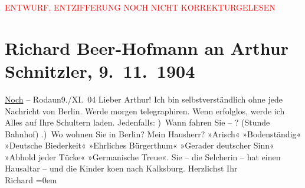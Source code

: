 
\begin{center}
            \textcolor{red}{ENTWURF. ENTZIFFERUNG NOCH NICHT KORREKTURGELESEN}
                      \end{center}
            
               \section[Richard Beer-Hofmann an Arthur Schnitzler, 9. 11. 1904]{ Richard Beer-Hofmann an Arthur Schnitzler,
               9. 11. 1904}\nopagebreak{}\rehead{ }\begin{ledgroupsized}[t]{13cm}\normalsize\beginnumbering{} \toendnotes[C]{\smallbreak\pagebreak[2]} 
\toendnotes[C]{\smallbreak}\pstart
           \centering{}\uline{Noch} – Rodaun9./XI. 04\pend
           \pstart
           Lieber Arthur! Ich bin selbstverständlich ohne jede Nachricht von
                  Berlin. Werde morgen telegraphiren. Wenn
               erfolglos, werde ich Alles auf Ihre Schultern laden. Jedenfalls:\pend
           ) Wann fahren Sie – \label{K_L01468_1v}\label{K_L01468_1h}? \introOben{}(Stunde Bahnhof)\introOben{}\pend
           .) Wo wohnen Sie in Berlin?\pend
           \pstart
           Mein Hausherr? »Arisch«
               »Bodenständig« »Deutsche Biederkeit« »Ehrliches Bürgerthum« »Gerader deutscher Sinn«
               »Abhold jeder Tücke« »Germanische Treue«. Sie – die Selcherin – hat einen Hausaltar – und die Kinder ko{\geminationm}en nach
                  Kalksburg.\pend
           \pstart
           Herzlichst Ihr{\\[\baselineskip]}\spacefill\mbox{Richard}\pend
           \leftskip=0em{}\endnumbering{}\end{ledgroupsized}  \newcommand{\dateiname}{L01468}\newcommand{\titel}{Richard Beer-Hofmann an Arthur Schnitzler, 9. 11. 1904}\newcommand{\editorInnen}{Martin Anton Müller und Gerd-Hermann Susen}
      